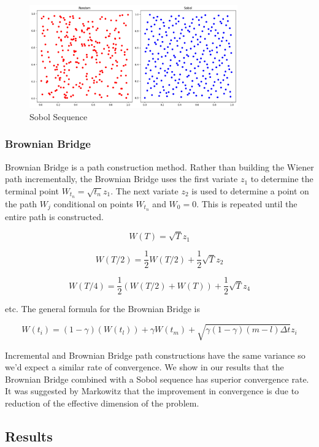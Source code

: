\documentclass{article}
\newcommand{\para}{\vspace{8pt}} %
\begin{document}
\begin{figure}[ht]
    \centering
    \includegraphics[width=0.8\textwidth]{images/sobol.png}
    \caption{Sobol Sequence}
    \label{fig:sobol}
\end{figure}

\subsubsection{Brownian Bridge}

Brownian Bridge is a path construction method. Rather than building the Wiener path incrementally, the Brownian Bridge uses
the first variate $z_1$ to determine the terminal point $W_{t_n} = \sqrt{t_n}z_1$. The next variate $z_2$ is used to determine a 
point on the path $W_j$ conditional on points $W_{t_n}$ and $W_0=0$. This is repeated until the entire path is constructed. 

\[
W(T) = \sqrt{T}z_1
\]

\[
W(T/2) = \frac{1}{2}W(T/2) + \frac{1}{2}\sqrt{T}z_2
\]

\[
W(T/4) = \frac{1}{2}(W(T/2) + W(T)) + \frac{1}{2}\sqrt{T}z_4
\]

etc. The general formula for the Brownian Bridge is

\[
W(t_i) = (1 - \gamma)(W(t_l)) + \gamma W(t_m) + \sqrt{\gamma(1-\gamma)(m-l)\Delta t}z_i
\]

\para
Incremental and Brownian Bridge path constructions have the same variance so we'd expect a similar rate of convergence. We show in our
results that the Brownian Bridge combined with a Sobol sequence has superior convergence rate. It was suggested by Markowitz\cite{markowitz} 
that the improvement in convergence is due to reduction of the effective dimension of the problem.

\subsection{Results}
\end{document}
